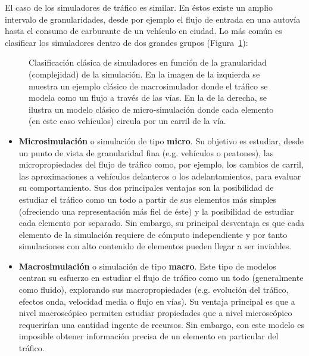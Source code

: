 El caso de los simuladores de tráfico es similar. En éstos existe un amplio intervalo de granularidades, desde por ejemplo el flujo de entrada en una autovía hasta el consumo de carburante de un vehículo en ciudad. Lo más común es clasificar los simuladores dentro de dos grandes grupos (Figura~\ref{fig:granularities-in-traffic-simulation}):

\begin{figure}
	\centering
	\qquad
	\caption[Clasificación de simuladores según granularidad]{Clasificación clásica de simuladores en función de la granularidad (complejidad) de la simulación. En la imagen de la izquierda se muestra un ejemplo clásico de macrosimulador donde el tráfico se modela como un flujo a través de las vías. En la de la derecha, se ilustra un modelo clásico de micro-simulación donde cada elemento (en este caso vehículos) circula por un carril de la vía.}
	\label{fig:granularities-in-traffic-simulation}
\end{figure}

\begin{itemize}
	\item \textbf{Microsimulación} o simulación de tipo \textbf{micro}. Su objetivo es estudiar, desde un punto de vista de granularidad fina (e.g. vehículos o peatones), las micropropiedades del flujo de tráfico como, por ejemplo, los cambios de carril, las aproximaciones a vehículos delanteros o los adelantamientos, para evaluar su comportamiento. Sus dos principales ventajas son la posibilidad de estudiar el tráfico como un todo a partir de sus elementos más simples (ofreciendo una representación más fiel de éste) y la posibilidad de estudiar cada elemento por separado. Sin embargo, su principal desventaja es que cada elemento de la simulación requiere de cómputo independiente y por tanto simulaciones con alto contenido de elementos pueden llegar a ser inviables.
	\item \textbf{Macrosimulación} o simulación de tipo \textbf{macro}. Este tipo de modelos centran su esfuerzo en estudiar el flujo de tráfico como un todo (generalmente como fluido), explorando sus macropropiedades (e.g. evolución del tráfico, efectos onda, velocidad media o flujo en vías). Su ventaja principal es que a nivel macroscópico permiten estudiar propiedades que a nivel microscópico requerirían una cantidad ingente de recursos. Sin embargo, con este modelo es imposible obtener información precisa de un elemento en particular del tráfico.
\end{itemize}

